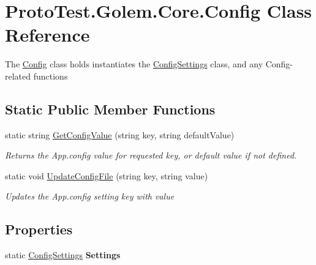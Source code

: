 \hypertarget{class_proto_test_1_1_golem_1_1_core_1_1_config}{\section{Proto\-Test.\-Golem.\-Core.\-Config Class Reference}
\label{class_proto_test_1_1_golem_1_1_core_1_1_config}
}


The \hyperlink{class_proto_test_1_1_golem_1_1_core_1_1_config}{Config} class holds instantiates the \hyperlink{class_proto_test_1_1_golem_1_1_core_1_1_config_settings}{Config\-Settings} class, and any Config-\/related functions  


\subsection*{Static Public Member Functions}
\begin{DoxyCompactItemize}
\item 
static string \hyperlink{class_proto_test_1_1_golem_1_1_core_1_1_config_a8e0b25e66e058a9c3ad91f1c9c7cd4ec}{Get\-Config\-Value} (string key, string default\-Value)
\begin{DoxyCompactList}\small\item\em Returns the App.\-config value for requested key, or default value if not defined. \end{DoxyCompactList}\item 
static void \hyperlink{class_proto_test_1_1_golem_1_1_core_1_1_config_a9a6f237ddae8e4aadd7efb8fabc7d6df}{Update\-Config\-File} (string key, string value)
\begin{DoxyCompactList}\small\item\em Updates the App.\-config setting key with value \end{DoxyCompactList}\end{DoxyCompactItemize}
\subsection*{Properties}
\begin{DoxyCompactItemize}
\item 
\hypertarget{class_proto_test_1_1_golem_1_1_core_1_1_config_a623170c7fb212773d46c0ed904405e92}{static \hyperlink{class_proto_test_1_1_golem_1_1_core_1_1_config_settings}{Config\-Settings} {\bfseries Settings}}\label{class_proto_test_1_1_golem_1_1_core_1_1_config_a623170c7fb212773d46c0ed904405e92}

\end{DoxyCompactItemize}


